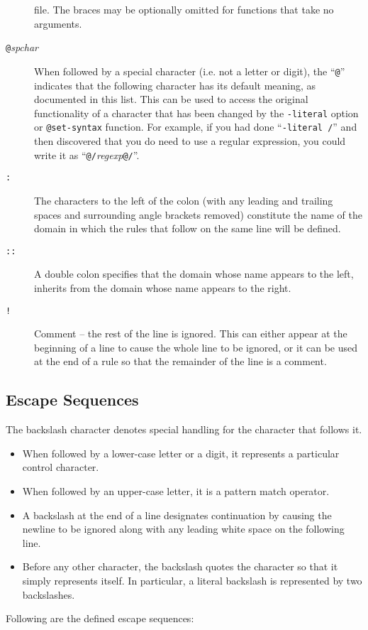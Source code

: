 \begin{description}
file. 
The braces may be optionally omitted for functions that take no arguments.
\item[{\tt @}{\it spchar}]
When followed by a special character (i.e. not a letter or digit),
the ``\verb/@/'' indicates that the following character has its default
meaning, as documented in this list.
This can be used to access the original functionality of a
character that has been changed by the
\verb/-literal/ option or \verb/@set-syntax/ function.
For example, if you had done ``\verb|-literal /|'' and then discovered that
you do need to use a regular expression, you could write it as
``\verb|@/|{\it regexp}\verb|@/|''.
\item[{\tt :}] 
The characters to the left of the colon (with any leading and trailing
spaces and surrounding angle brackets removed) constitute the name of
the domain in which the rules that follow on the same line will be defined.
\item[{\tt ::}]
A double colon specifies that the domain whose name appears to the left,
inherits from the domain whose name appears to the right.
\item[{\tt !}]
Comment -- the rest of the line is ignored.  This can either appear at
the beginning of a line to cause the whole line to be ignored, or it can
be used at the end of a rule so that the remainder of the line is a comment.
\end{description}


\subsection{Escape Sequences}
The backslash character denotes special handling for the character that
follows it.
\begin{itemize}
\item When followed by a lower-case letter or a digit, it
represents a particular control character.
\item When followed by an upper-case letter, it is a pattern match operator.
\item A backslash at the end of
a line designates continuation by causing the newline to be ignored
along with any leading white space on the following line.
\item Before any other character, the backslash quotes the character so that
it simply represents itself.  In particular, a literal backslash is
represented by two backslashes.
\end{itemize}

Following are the defined escape sequences:

